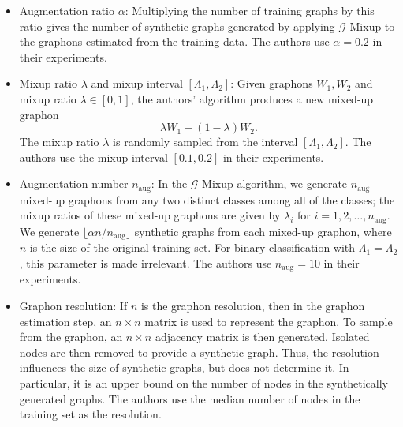 \begin{itemize} \item Augmentation ratio $\alpha$: Multiplying the number of training graphs by this ratio gives the number of synthetic graphs generated by applying $\mathcal{G}$-Mixup to the graphons estimated from the training data. The authors use $\alpha=0.2$ in their experiments.

\item Mixup ratio $\lambda$ and mixup interval $[\Lambda_1,\Lambda_2]$: Given graphons $W_1,W_2$ and mixup ratio $\lambda \in [0,1]$, the authors' algorithm produces a new mixed-up graphon 
\begin{equation}\lambda W_1 + (1-\lambda)W_2.\label{eqn:graphon mixup}\end{equation} 
The mixup ratio $\lambda$ is randomly sampled from the interval $[\Lambda_1, \Lambda_2]$. The authors use the mixup interval $[0.1,0.2]$ in their experiments.  

\item Augmentation number $n_{\text{aug}}$: In the $\mathcal{G}$-Mixup algorithm, we generate $n_{\text{aug}}$ mixed-up graphons from any two distinct classes among all of the classes; the mixup ratios of these mixed-up graphons are given by $\lambda_i$ for $i = 1,2,\ldots,n_{\text{aug}}$. We generate $\lfloor \alpha n/n_{\text{aug}}\rfloor$ synthetic graphs from each mixed-up graphon, where $n$ is the size of the original training set. For binary classification with $\Lambda_1 = \Lambda_2$, this parameter is made irrelevant. The authors use $n_{\text{aug}}=10$ in their experiments.


\item Graphon resolution: If $n$ is the graphon resolution, then in the graphon estimation step, an $n\times n$ matrix is used to represent the graphon. To sample from the graphon, an $n\times n$ adjacency matrix is then generated. Isolated nodes are then removed to provide a synthetic graph. Thus, the resolution influences the size of synthetic graphs, but does not determine it. In particular, it is an upper bound on the number of nodes in the synthetically generated graphs. The authors use the median number of nodes in the training set as the resolution.
\end{itemize}

